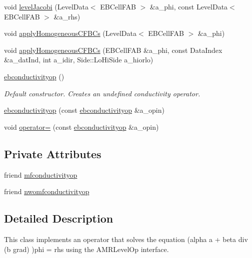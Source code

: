 \begin{DoxyCompactItemize}
\item 
void \hyperlink{classebconductivityop_afeea11ccb7f99b05c8819b3f95d35512}{level\+Jacobi} (Level\+Data$<$ E\+B\+Cell\+F\+AB $>$ \&a\+\_\+phi, const Level\+Data$<$ E\+B\+Cell\+F\+AB $>$ \&a\+\_\+rhs)
\item 
void \hyperlink{classebconductivityop_ab1fbe48a842bc8d7e6941e162b2d55ea}{apply\+Homogeneous\+C\+F\+B\+Cs} (Level\+Data$<$ E\+B\+Cell\+F\+AB $>$ \&a\+\_\+phi)
\item 
void \hyperlink{classebconductivityop_a487305eb89c9b3589d8540bf9c047705}{apply\+Homogeneous\+C\+F\+B\+Cs} (E\+B\+Cell\+F\+AB \&a\+\_\+phi, const Data\+Index \&a\+\_\+dat\+Ind, int a\+\_\+idir, Side\+::\+Lo\+Hi\+Side a\+\_\+hiorlo)
\item 
\hyperlink{classebconductivityop_a034c163185e7a8830484419512e60158}{ebconductivityop} ()
\begin{DoxyCompactList}\small\item\em Default constructor. Creates an undefined conductivity operator. \end{DoxyCompactList}\item 
\hyperlink{classebconductivityop_a8d2a74ddcb7e2aebf83547a3f08cc5b3}{ebconductivityop} (const \hyperlink{classebconductivityop}{ebconductivityop} \&a\+\_\+opin)
\item 
void \hyperlink{classebconductivityop_a6739afd90afddbfeffbada2cf7831e1f}{operator=} (const \hyperlink{classebconductivityop}{ebconductivityop} \&a\+\_\+opin)
\end{DoxyCompactItemize}
\subsection*{Private Attributes}
\begin{DoxyCompactItemize}
\item 
friend \hyperlink{classebconductivityop_a75193f34564781bf8ea69fe3b4953c9b}{mfconductivityop}
\item 
friend \hyperlink{classebconductivityop_a07aef0f47985289f2d36dfc68093776b}{nwomfconductivityop}
\end{DoxyCompactItemize}


\subsection{Detailed Description}
This class implements an operator that solves the equation (alpha a + beta div (b grad) )phi = rhs using the A\+M\+R\+Level\+Op interface. 

